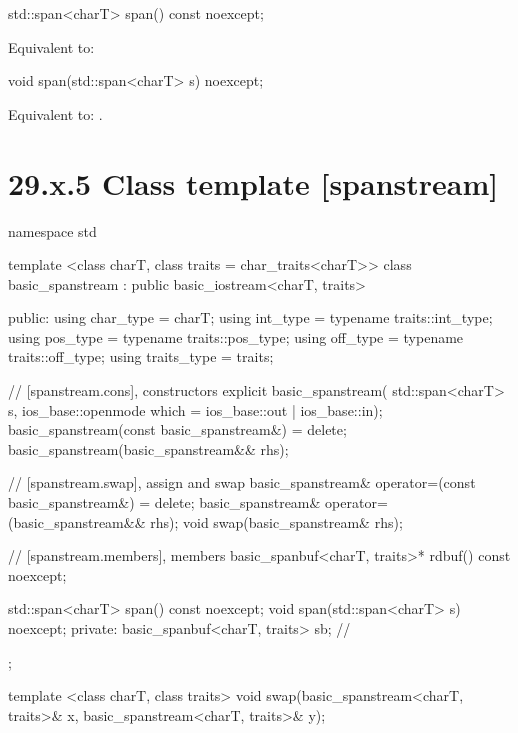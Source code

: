 \documentclass[ebook,11pt,article]{memoir}
\renewcommand{\iref}[1]{[#1]}
\begin{document}
\begin{itemdecl}
std::span<charT> span() const noexcept;
\end{itemdecl}

\begin{itemdescr}
\pnum
\effects Equivalent to: \\
\end{itemdescr}

\begin{itemdecl}
void span(std::span<charT> s) noexcept;
\end{itemdecl}

\begin{itemdescr}
\pnum
\effects
Equivalent to:
.
\end{itemdescr}

\section{29.x.5 Class template  [spanstream] }

\begin{codeblock}
namespace std {
  template <class charT, class traits = char_traits<charT>>
  class basic_spanstream
    : public basic_iostream<charT, traits> {
  public:
    using char_type      = charT;
    using int_type       = typename traits::int_type;
    using pos_type       = typename traits::pos_type;
    using off_type       = typename traits::off_type;
    using traits_type    = traits;

    // \iref{spanstream.cons}, constructors
    explicit basic_spanstream(
      std::span<charT> s,
      ios_base::openmode which = ios_base::out | ios_base::in);
    basic_spanstream(const basic_spanstream&) = delete;
    basic_spanstream(basic_spanstream&& rhs);

    // \iref{spanstream.swap}, assign and swap
    basic_spanstream& operator=(const basic_spanstream&) = delete;
    basic_spanstream& operator=(basic_spanstream&& rhs);
    void swap(basic_spanstream& rhs);

    // \iref{spanstream.members}, members
    basic_spanbuf<charT, traits>* rdbuf() const noexcept;

    std::span<charT> span() const noexcept;
    void span(std::span<charT> s) noexcept;
  private:
    basic_spanbuf<charT, traits> sb; // \expos
  };

  template <class charT, class traits>
    void swap(basic_spanstream<charT, traits>& x,
              basic_spanstream<charT, traits>& y);
}
\end{codeblock}
\end{document}
